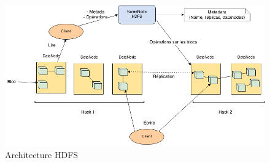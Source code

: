 \begin{figure}[ht!]
  \centering
  \includegraphics[width=16cm]{images/hadoop_arch.png}
  \caption{Architecture HDFS}
  \label{fig:archi-hdfs}
\end{figure}

